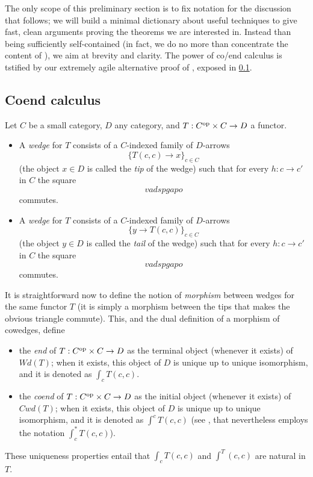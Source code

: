 The only scope of this preliminary section is to fix notation for the discussion that follows; we will build a minimal dictionary about useful techniques to give fast, clean arguments proving the theorems we are interested in. Instead than being sufficiently self-contained (in fact, we do no more than concentrate the content of \cite[§1,2]{cofriend}), we aim at brevity and clarity. The power of co/end calculus is tstified by our extremely agile alternative proof of \cite[???]{adamek2002classification}, exposed in \ref{}.
\subsection{Coend calculus}
\begin{definition}[Co/wedges]
Let $C$ be a small category, $D$ any category, and $T : C^{\text{op}}\times C \to D$ a functor.
\begin{itemize}
	\item A \emph{wedge} for $T$ consists of a $C$-indexed family of $D$-arrows
	\[
	\{T(c,c)\to x\}_{c\in C}
	\]
	(the object $x\in D$ is called the \emph{tip} of the wedge) such that for every $h : c\to c'$ in $C$ the square
	\[vadspgapo\]
	commutes.
	\item A \emph{wedge} for $T$ consists of a $C$-indexed family of $D$-arrows
	\[
	\{y\to T(c,c)\}_{c\in C}
	\]
	(the object $y\in D$ is called the \emph{tail} of the wedge) such that for every $h : c\to c'$ in $C$ the square
	\[vadspgapo\]
	commutes.
\end{itemize}
\end{definition}
\begin{definition}
It is straightforward now to define the notion of \emph{morphism} between wedges for the same functor $T$ (it is simply a morphism between the tips that makes the obvious triangle commute). This, and the dual definition of a morphism of cowedges, define
\begin{itemize}
	\item the \emph{end} of $T :C^{\text{op}}\times C \to D$ as the terminal object (whenever it exists) of $Wd(T)$; when it exists, this object of $D$ is unique up to unique isomorphism, and it is denoted as $\int_c T(c,c)$.
	\item the \emph{coend} of $T :C^{\text{op}}\times C \to D$ as the initial object (whenever it exists) of $Cwd(T)$; when it exists, this object of $D$ is unique up to unique isomorphism, and it is denoted as $\int^c T(c,c)$ (see \cite{yoneda}, that nevertheless employs the notation $\int_c^* T(c,c)$).
\end{itemize}
These uniqueness properties entail that $\int_c T(c,c)$ and $\int^T(c,c)$ are natural in $T$.
\end{definition}

